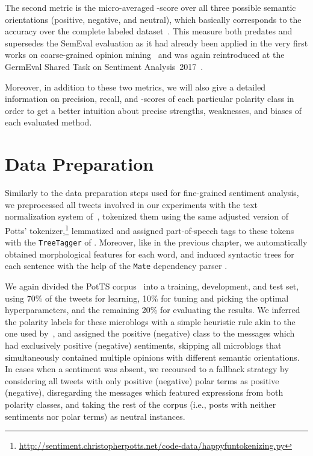 The second metric is the micro-averaged \F-score over all three
possible semantic orientations (positive, negative, and neutral),
which basically corresponds to the accuracy over the complete labeled
dataset~\cite[see][p.~577]{Manning:99}.  This measure both predates
and supersedes the SemEval evaluation as it had already been applied
in the very first works on coarse-grained opinion
mining~\cite{Wiebe:99,Das:01,Read:05,Kennedy:06,Go:09} and was again
reintroduced at the GermEval Shared Task on Sentiment
Analysis~2017~\cite{Wojatzki:17}.

Moreover, in addition to these two metrics, we will also give a
detailed information on precision, recall, and \F-scores of each
particular polarity class in order to get a better intuition about
precise strengths, weaknesses, and biases of each evaluated method.

\section{Data Preparation}\label{sec:cgsa:data}

Similarly to the data preparation steps used for fine-grained
sentiment analysis, we preprocessed all tweets involved in our
experiments with the text normalization system
of~\citet{Sidarenka:13}, tokenized them using the same adjusted
version of Potts'
tokenizer,\footnote{\url{http://sentiment.christopherpotts.net/code-data/happyfuntokenizing.py}}
lemmatized and assigned part-of-speech tags to these tokens with the
\texttt{TreeTagger} of \citet{Schmid:95}.  Moreover, like in the
previous chapter, we automatically obtained morphological features for
each word, and induced syntactic trees for each sentence with the help
of the \texttt{Mate} dependency parser
\cite{Bohnet:13}. %

We again divided the PotTS corpus~\cite{Sidarenka:16} into a training,
development, and test set, using 70\% of the tweets for learning, 10\%
for tuning and picking the optimal hyperparameters, and the remaining
20\% for evaluating the results.  We inferred the polarity labels for
these microblogs with a simple heuristic rule akin to the one used
by~\citet{Wiebe:05a}, and assigned the positive (negative) class to
the messages which had exclusively positive (negative) sentiments,
skipping all microblogs that simultaneously contained multiple
opinions with different semantic orientations.  In cases when a
sentiment was absent, we recoursed to a fallback strategy by
considering all tweets with only positive (negative) polar terms as
positive (negative), disregarding the messages which featured
expressions from both polarity classes, and taking the rest of the
corpus (i.e., posts with neither sentiments nor polar terms) as
neutral instances.

